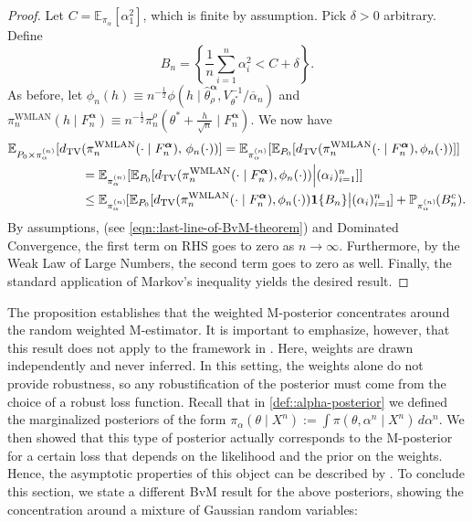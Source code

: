 \documentclass[11pt, oneside]{amsart}
\theoremstyle{definition}   %
\newcommand{\E}{\mathbb{E}}
\newcommand{\loss}{\rho}
\newcommand{\mposterior}{\pi_n^{\loss}}
\newcommand{\wempirical}{F_n^{\boldsymbol{\alpha}}}
\newcommand{\mestimator}{\hat{\theta}^{\boldsymbol{\alpha}}_{\loss }}
\begin{document}
\begin{proof}
    Let $C = \mathbb{E}_{\pi_\alpha} \left [ \alpha_1^2 \right ]$, which is finite by assumption.
    Pick $\delta > 0$ arbitrary. Define 
    \[
    B_n = \left \{ \frac{1}{n} \sum_{i = 1}^n \alpha_i^2 < C + \delta \right \}.
    \]
    As before, let $\phi_n(h) \equiv n ^ {- \frac{1}{2}} \phi (h \mid \mestimator, V_{\theta^*}^{-1} / \overline{\alpha}_n)$
    and $\pi^{\mathrm{WMLAN}}_{n}(h \mid \wempirical) \equiv n ^ {- \frac{1}{2}} \mposterior (\theta ^ * + \frac{h}{\sqrt{n}} \mid \wempirical)$. We now have
    \begin{align*}
        \E_{P_0 \times \pi_\alpha^{(n)}} [ d_{\mathrm{TV}} & ( \pi^{\mathrm{WMLAN}}_{n}(\cdot \mid \wempirical),  \, \phi_n(\cdot)  )  ] =  \E_{\pi_\alpha^{(n)}} [ \E_{P_0}  [ d_{\mathrm{TV}}  ( \pi^{\mathrm{WMLAN}}_{n}(\cdot \mid \wempirical),  \phi_n(\cdot) ) ]] \\
        &= \E_{\pi_\alpha^{(n)}}  [ \E_{P_0}  [ d_{\mathrm{TV}}  ( \pi^{\mathrm{WMLAN}}_{n}(\cdot \mid \wempirical), \phi_n(\cdot) )  \Big |  (\alpha_i)_{i = 1}^{n} ]] \\
        &\leq \E_{\pi_\alpha^{(n)}} \hspace{-1pt} [ \E_{P_0}  [ d_{\mathrm{TV}} (\pi^{\mathrm{WMLAN}}_{n}(\cdot \mid \wempirical),  \phi_n(\cdot)  ) \mathbf{1} \{ B_n \} \big | (\alpha_i)_{i = 1}^{n} \hspace{-1pt}] + \mathbb{P}_{\pi_\alpha^{(n)}} \hspace{-1pt}( B_n^c ).
    \end{align*}
    By assumptions,  (see \eqref{eqn::last-line-of-BvM-theorem}) and Dominated Convergence, the first term on RHS goes to zero as $n \rightarrow \infty$.
    Furthermore, by the Weak Law of Large Numbers, the second term goes to zero as well.
    Finally, the standard application of Markov's inequality yields the desired result.
\end{proof}
%


The proposition establishes that the weighted M-posterior concentrates around the random weighted M-estimator. It is important to emphasize, however, that this result does not apply to the framework in . Here, weights are drawn independently and never inferred. In this setting, the weights alone do not provide robustness, so any robustification of the posterior must come from the choice of a robust loss function. Recall that in \eqref{def::alpha-posterior} we defined the marginalized posteriors of the form
%
$
    \pi_\alpha(\theta \mid X^n) := \int \pi(\theta, \alpha^n \mid X^n) \, d\alpha^n.
$
%
We then showed that this type of posterior actually corresponds to the M-posterior for a certain loss that depends on the likelihood and the prior on the weights. Hence, the asymptotic properties of this object can be described by . To conclude this section, we state a different BvM result for the above posteriors, showing the concentration around a mixture of Gaussian random variables:
\end{document}
